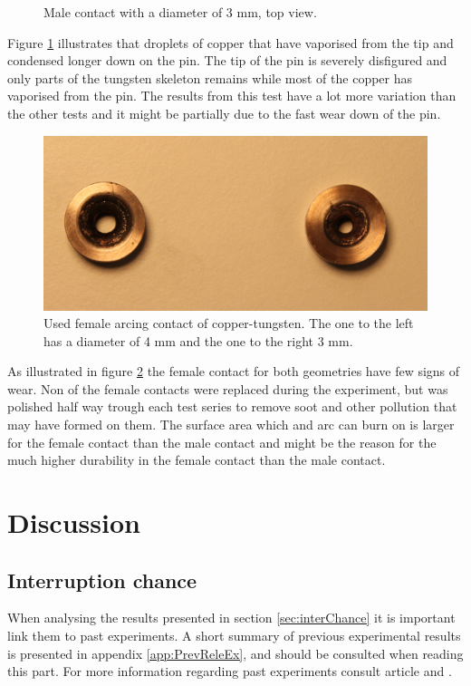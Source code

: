 \documentclass[10pt,a4paper]{article}
\begin{document}
\begin{figure}[H]
\begin{minipage}{.5\textwidth}
  \caption{Male contact with a diameter of 3 mm, \newline top view.}
  \label{fig:d3_burn_top}
\end{minipage}
\end{figure}

Figure \ref{fig:d3_burn_top} illustrates that droplets of copper that have vaporised from the tip and condensed longer down on the pin. The tip of the pin is severely disfigured and only parts of the tungsten skeleton remains while most of the copper has vaporised from the pin. The results from this test have a lot more variation than the other tests and it might be partially due to the fast wear down of the pin.  


\begin{figure}[H]
\centering
\includegraphics[scale=0.4]{Bilder/Discussion/femaleContacts4mmand3mm.png}
\caption{Used female arcing contact of copper-tungsten. The one to the left has a diameter of 4 mm and the one to the right 3 mm.} \label{fig:used_d4_d3_female}
\end{figure}

As illustrated in figure \ref{fig:used_d4_d3_female} the female contact for both geometries have few signs of wear. Non of the female contacts were replaced during the experiment, but was polished half way trough each test series to remove soot and other pollution that may have formed on them. The surface area which and arc can burn on is larger for the female contact than the male contact and might be the reason for the much higher durability in the female contact than the male contact.

\newpage

\section{Discussion}
\subsection{Interruption chance} \label{sec:DiscIntChan}
When analysing the results presented in section \ref{sec:interChance} it is important link them to past experiments. A short summary of previous experimental results is presented in appendix \ref{app:PrevReleEx}, and should be consulted when reading this part. For more information regarding past experiments consult article \cite{bib:CIAMVLBS} and \cite{bib:AFIMVLBA}.
\end{document}
